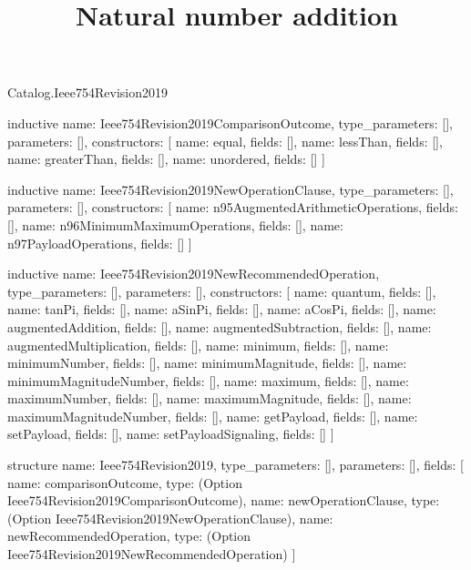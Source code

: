 \begin{lexlean}{Catalog.Ieee754Revision2019}
\title{Natural number addition}
\begin{semanticmodule}
inductive{
  name: Ieee754Revision2019ComparisonOutcome,
  type_parameters: [],
  parameters: [],
  constructors: [
    {name: equal, fields: []},
    {name: lessThan, fields: []},
    {name: greaterThan, fields: []},
    {name: unordered, fields: []}
  ]
}

inductive{
  name: Ieee754Revision2019NewOperationClause,
  type_parameters: [],
  parameters: [],
  constructors: [
    {name: n95AugmentedArithmeticOperations, fields: []},
    {name: n96MinimumMaximumOperations, fields: []},
    {name: n97PayloadOperations, fields: []}
  ]
}

inductive{
  name: Ieee754Revision2019NewRecommendedOperation,
  type_parameters: [],
  parameters: [],
  constructors: [
    {name: quantum, fields: []},
    {name: tanPi, fields: []},
    {name: aSinPi, fields: []},
    {name: aCosPi, fields: []},
    {name: augmentedAddition, fields: []},
    {name: augmentedSubtraction, fields: []},
    {name: augmentedMultiplication, fields: []},
    {name: minimum, fields: []},
    {name: minimumNumber, fields: []},
    {name: minimumMagnitude, fields: []},
    {name: minimumMagnitudeNumber, fields: []},
    {name: maximum, fields: []},
    {name: maximumNumber, fields: []},
    {name: maximumMagnitude, fields: []},
    {name: maximumMagnitudeNumber, fields: []},
    {name: getPayload, fields: []},
    {name: setPayload, fields: []},
    {name: setPayloadSignaling, fields: []}
  ]
}

structure{
  name: Ieee754Revision2019,
  type_parameters: [],
  parameters: [],
  fields: [
    {name: comparisonOutcome, type: (Option Ieee754Revision2019ComparisonOutcome)},
    {name: newOperationClause, type: (Option Ieee754Revision2019NewOperationClause)},
    {name: newRecommendedOperation, type: (Option Ieee754Revision2019NewRecommendedOperation)}
  ]
}
\end{semanticmodule}
\end{lexlean}
